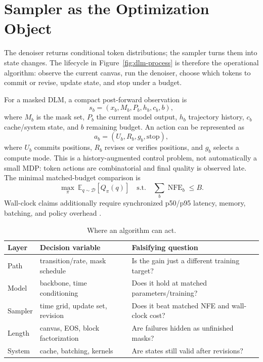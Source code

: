 \documentclass{article}
\newcommand{\Data}{\mathcal{D}}
\newcommand{\NFE}{\operatorname{NFE}}
\begin{document}
\section{Sampler as the Optimization Object}

The denoiser returns conditional token distributions; the sampler turns them
into state changes.  The lifecycle in Figure~\ref{fig:dlm-process} is therefore
the operational algorithm: observe the current canvas, run the denoiser, choose
which tokens to commit or revise, update state, and stop under a budget.

For a masked DLM, a compact post-forward observation is
\begin{equation}
s_b=(x_b,M_b,P_b,h_b,c_b,b),
\label{eq:state}
\end{equation}
where \(M_b\) is the mask set, \(P_b\) the current model output, \(h_b\)
trajectory history, \(c_b\) cache/system state, and \(b\) remaining budget.
An action can be represented as
\begin{equation}
a_b=(U_b,R_b,g_b,\mathrm{stop}),
\label{eq:action}
\end{equation}
where \(U_b\) commits positions, \(R_b\) revises or verifies positions, and
\(g_b\) selects a compute mode.  This is a history-augmented control problem,
not automatically a small MDP: token actions are combinatorial and final
quality is observed late.  The minimal matched-budget comparison is
\begin{equation}
\max_\pi\ \mathbb{E}_{q\sim\Data}[Q_\pi(q)]
\quad\text{s.t.}\quad \sum_b\NFE_b\le B.
\label{eq:budget}
\end{equation}
Wall-clock claims additionally require synchronized p50/p95 latency, memory,
batching, and policy overhead \citep{gwak2026acceleration}.

\begin{table}[H]
\caption{Where an algorithm can act.}
\label{tab:surfaces}
\centering
\footnotesize
\begin{tabular}{p{15mm}p{24mm}p{27mm}}
\toprule
Layer & Decision variable & Falsifying question \\
\midrule
Path & transition/rate, mask schedule & Is the gain just a different training target? \\
Model & backbone, time conditioning & Does it hold at matched parameters/training? \\
Sampler & time grid, update set, revision & Does it beat matched NFE and wall-clock cost? \\
Length & canvas, EOS, block factorization & Are failures hidden as unfinished masks? \\
System & cache, batching, kernels & Are states still valid after revisions? \\
\bottomrule
\end{tabular}
\end{table}
\end{document}
